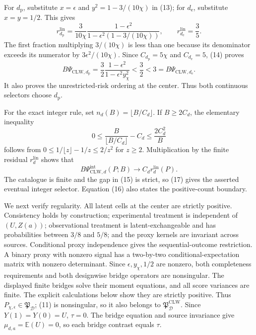 For \(d_{\mathrm p}\), substitute \(x=\epsilon\) and \(y^2=1-3/(10\chi)\) in (13); for \(d_{\mathrm e}\), substitute \(x=y=1/2\).  This gives
\[
 r_{d_{\mathrm p}}^{\mathrm{lin}}
 =\frac{3}{10\chi}
 \frac{1-\epsilon^2}{1-\epsilon^2(1-3/(10\chi))},
 \qquad
 r_{d_{\mathrm e}}^{\mathrm{lin}}=\frac35.               \tag{14}
\]
The first fraction multiplying \(3/(10\chi)\) is less than one because its denominator exceeds its numerator by \(3\epsilon^2/(10\chi)\).  Since \(C_{d_{\mathrm p}}=5\chi\) and \(C_{d_{\mathrm e}}=5\), (14) proves
\[
 B\Psi_{\mathrm{CLW},d_{\mathrm p}}
 =\frac32\frac{1-\epsilon^2}{1-\epsilon^2y_\chi^2}
 <\frac32<3
 =B\Psi_{\mathrm{CLW},d_{\mathrm e}}.                    \tag{15}
\]
It also proves the unrestricted-risk ordering at the center.  Thus both continuous selectors choose \(d_{\mathrm p}\).

For the exact integer rule, set \(n_d(B)=\lfloor B/C_d\rfloor\).  If \(B\ge2C_d\), the elementary inequality
\[
 0\le \frac{B}{\lfloor B/C_d\rfloor}-C_d
 \le\frac{2C_d^2}{B}                                      \tag{16}
\]
follows from \(0\le1/\lfloor z\rfloor-1/z\le2/z^2\) for \(z\ge2\).  Multiplication by the finite residual \(r_d^{\mathrm{lin}}\) shows that
\[
 B\Psi_{\mathrm{CLW},d}^{\mathrm{int}}(P;B)
 \longrightarrow C_dr_d^{\mathrm{lin}}(P).                \tag{17}
\]
The catalogue is finite and the gap in (15) is strict, so (17) gives the asserted eventual integer selector.  Equation (16) also states the positive-count boundary.

We next verify regularity.  All latent cells at the center are strictly positive.  Consistency holds by construction; experimental treatment is independent of \((U,Z(a))\); observational treatment is latent-exchangeable and has probabilities between \(3/8\) and \(5/8\); and the proxy kernels are invariant across sources.  Conditional proxy independence gives the sequential-outcome restriction.  A binary proxy with nonzero signal has a two-by-two conditional-expectation matrix with nonzero determinant.  Since \(\epsilon,y_\chi,1/2\) are nonzero, both completeness requirements and both designwise bridge operators are nonsingular.  The displayed finite bridges solve their moment equations, and all score variances are finite.  The explicit calculations below show they are strictly positive.  Thus \(P_{\chi,\epsilon}\in\mathfrak P_{\mathcal D}\); (11) is nonsingular, so it also belongs to \(\mathfrak P_{\mathcal D}^{\mathrm{CLW}}\).  Since \(Y(1)=Y(0)=U\), \(\tau=0\).  The bridge equation and source invariance give \(\mu_{d,a}=\mathbb E(U)=0\), so each bridge contrast equals \(\tau\).

